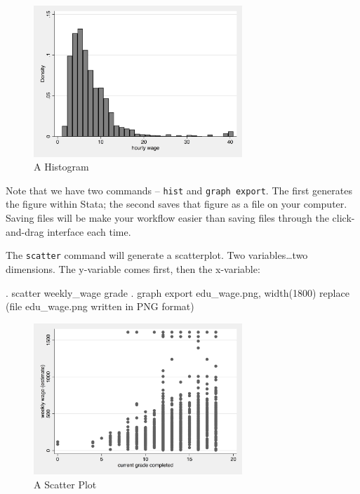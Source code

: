 \documentclass[]{article}
\begin{document}
\begin{figure}
\centering
\includegraphics[width=0.70000\textwidth]{hist_wage.png}
\caption{A Histogram}
\end{figure}

Note that we have two commands -- \texttt{hist} and
\texttt{graph\ export}. The first generates the figure within Stata; the
second saves that figure as a file on your computer. Saving files will
be make your workflow easier than saving files through the
click-and-drag interface each time.

The \texttt{scatter} command will generate a scatterplot. Two
variables\ldots{}two dimensions. The y-variable comes first, then the
x-variable:

\begin{stlog}
. scatter weekly_wage grade
{\smallskip}
. graph export edu_wage.png, width(1800) replace
(file edu_wage.png written in PNG format)
{\smallskip}
\end{stlog}

\begin{figure}
\centering
\includegraphics[width=0.70000\textwidth]{edu_wage.png}
\caption{A Scatter Plot}
\end{figure}
\end{document}
